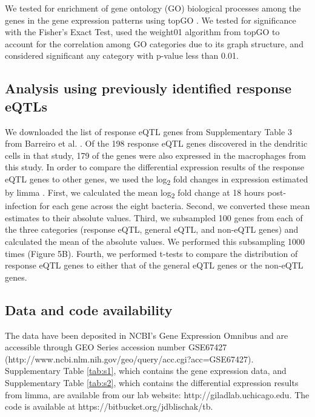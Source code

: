 We tested for enrichment of gene ontology (GO) biological processes
among the genes in the gene expression patterns using topGO
\citep{Alexa2006}. We tested for significance with the Fisher's Exact
Test, used the weight01 algorithm from topGO to account for the
correlation among GO categories due to its graph structure, and
considered significant any category with p-value less than 0.01.

\subsection{Analysis using previously identified response
eQTLs}\label{analysis-using-previously-identified-response-eqtls}

We downloaded the list of response eQTL genes from Supplementary Table 3
from Barreiro et al. \citep{Barreiro2012}. Of the 198 response eQTL genes
discovered in the dendritic cells in that study, 179 of the genes were
also expressed in the macrophages from this study. In order to compare
the differential expression results of the response eQTL genes to other
genes, we used the log\textsubscript{2} fold changes in expression
estimated by limma \citep{Ritchie2015}. First, we calculated the mean
log\textsubscript{2} fold change at 18 hours post-infection for each
gene across the eight bacteria. Second, we converted these mean
estimates to their absolute values. Third, we subsampled 100 genes from
each of the three categories (response eQTL, general eQTL, and non-eQTL
genes) and calculated the mean of the absolute values. We performed this
subsampling 1000 times (Figure 5B). Fourth, we performed t-tests to
compare the distribution of response eQTL genes to either that of the
general eQTL genes or the non-eQTL genes.

\subsection{Data and code
availability}\label{data-and-code-availability}

The data have been deposited in NCBI's Gene Expression Omnibus
\citep{Edgar2002} and are accessible through GEO Series accession number
GSE67427 (http://www.ncbi.nlm.nih.gov/geo/query/acc.cgi?acc=GSE67427).
Supplementary Table \ref{tab:s1}, which contains the gene expression data, and
Supplementary Table \ref{tab:s2}, which contains the differential expression
results from limma, are available from our lab website:
http://giladlab.uchicago.edu. The code is available at
https://bitbucket.org/jdblischak/tb.

